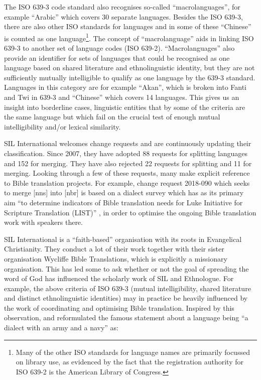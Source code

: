 \documentclass[a4paper,10pt]{article} %
\begin{document}
The ISO 639-3 code standard also recognises so-called ``macrolanguages'', for example ``Arabic'' which covers 30 separate languages. Besides the ISO 639-3, there are also other ISO standards for languages and in some of these ``Chinese'' is counted as one language\footnote{Many of the other ISO standards for language names are primarily focussed on library use, as evidenced by the fact that the registration authority for ISO 639-2 is the American Library of Congress.}. The concept of ``macrolanguage'' aids in linking ISO 639-3 to another set of language codes (ISO 639-2). ``Macrolanguages'' also provide an identifier for sets of languages that could be recognised as one language based on shared literature and ethnolinguistic identity, but they are not sufficiently mutually intelligible to qualify as one language by the 639-3 standard. Languages in this category are for example ``Akan'', which is broken into Fanti and Twi in 639-3 and ``Chinese'' which covers 14 languages. This gives us an insight into borderline cases, linguistic entities that by some of the criteria are the same language but which fail on the crucial test of enough mutual intelligibility and/or lexical similarity. 

SIL International welcomes change requests and are continuously updating their classification. Since 2007, they have adopted 88 requests for splitting languages and 152 for merging. They have also rejected 22 requests for splitting and 11 for merging. Looking through a few of these requests, many make explicit reference to Bible translation projects. For example, change request 2018-090 which seeks to merge [nns] into [nbr] is based on a dialect survey which has as its primary aim ``to determine indicators of Bible translation needs for Luke Initiative for Scripture Translation (LIST)'' \citep{change_request_SIL_example}, in order to optimise the ongoing Bible translation work with speakers there.

SIL International is a ``faith-based'' organisation with its roots in Evangelical Christianity. They conduct a lot of their work together with their sister organisation Wycliffe Bible Translations, which is explicitly a missionary organisation. This has led some to ask whether or not the goal of spreading the word of God has influenced the scholarly work of SIL and Ethnologue. For example, the above criteria of ISO 639-3 (mutual intelligibility, shared literature and distinct ethnolinguistic identities) may in practice be heavily influenced by the work of coordinating and optimising Bible translation. Inspired by this observation, \citet{lupkestorch2013} and \citet{blommaert2008artefactual} reformulated the famous statement about a language being ``a dialect with an army and a navy'' as: 
\end{document}
